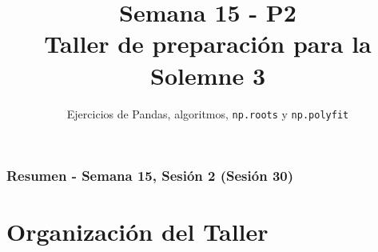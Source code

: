 \documentclass[10pt]{beamer}
\title[Semana 15 - P2]{Semana 15 - P2\\Taller de preparación para la Solemne 3}
\subtitle{Ejercicios de Pandas, algoritmos, \texttt{np.roots} y \texttt{np.polyfit}}
\begin{document}
\myfront{}

\begin{frame}
  \titlepage
\end{frame}

\begin{frame}
  \frametitle{Resumen - Semana 15, Sesión 2 (Sesión 30)}
  \tableofcontents
\end{frame}


\section{Organización del Taller}

\end{document}
